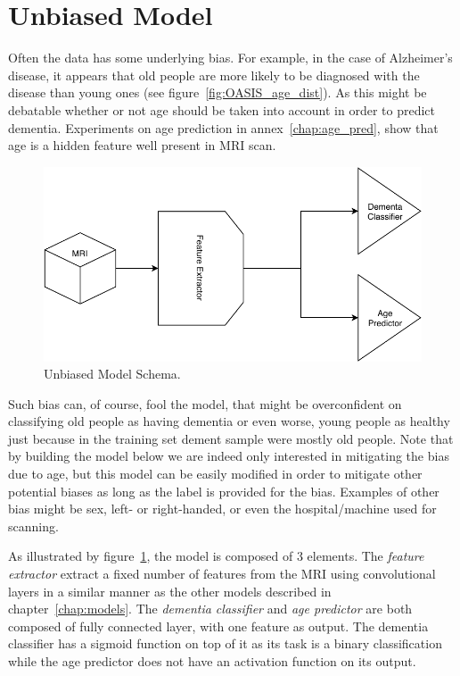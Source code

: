 \section{Unbiased Model}
\label{sec:unbias_model}

Often the data has some underlying bias. For example, in the case of Alzheimer’s disease, it appears that old people are more likely to be diagnosed with the disease than young ones (see figure~\ref{fig:OASIS_age_dist}). As this might be debatable whether or not age should be taken into account in order to predict dementia. Experiments on age prediction in annex~\ref{chap:age_pred}, show that age is a hidden feature well present in MRI scan.

\begin{figure}
 \centering
 \includegraphics[width=.9\linewidth]{figures/models/Unbias_model.pdf}
 \captionsetup{width=.9\linewidth}
 \caption[UnbiasModelSchema]{Unbiased Model Schema.}
 \label{fig:unbias_model_schema}
\end{figure}

Such bias can, of course, fool the model, that might be overconfident on classifying old people as having dementia or even worse, young people as healthy just because in the training set dement sample were mostly old people.
Note that by building the model below we are indeed only interested in mitigating the bias due to age, but this model can be easily modified in order to mitigate other potential biases as long as the label is provided for the bias. Examples of other bias might be sex, left- or right-handed, or even the hospital/machine used for scanning.


As illustrated by figure~\ref{fig:unbias_model_schema}, the model is composed of 3 elements. The \textit{feature extractor} extract a fixed number of features from the MRI using convolutional layers in a similar manner as the other models described in chapter~\ref{chap:models}. The \textit{dementia classifier} and \textit{age predictor} are both composed of fully connected layer, with one feature as output. The dementia classifier has a sigmoid function on top of it as its task is a binary classification while the age predictor does not have an activation function on its output.

